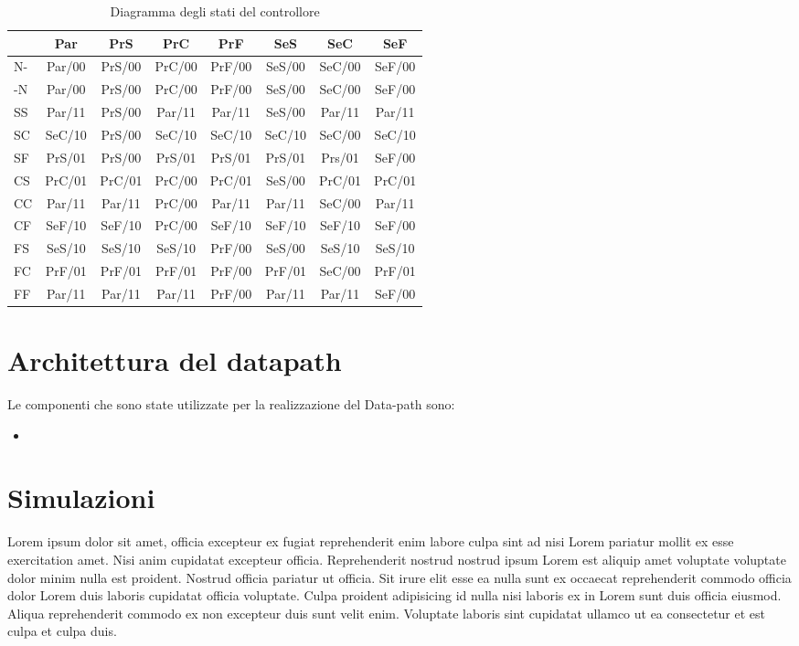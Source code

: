 \documentclass[a4paper]{article}
\begin{document}
\begin{table}[H]
	\begin{center}
		\begin{tabular}{l|c|c|c|c|c|c|c}
			   & Par    & PrS    & PrC    & PrF    & SeS    & SeC    & SeF    \\
			\hline
			N- & Par/00 & PrS/00 & PrC/00 & PrF/00 & SeS/00 & SeC/00 & SeF/00 \\
			\hline
			-N & Par/00 & PrS/00 & PrC/00 & PrF/00 & SeS/00 & SeC/00 & SeF/00 \\
			\hline
			SS & Par/11 & PrS/00 & Par/11 & Par/11 & SeS/00 & Par/11 & Par/11 \\
			\hline
			SC & SeC/10 & PrS/00 & SeC/10 & SeC/10 & SeC/10 & SeC/00 & SeC/10 \\
			\hline
			SF & PrS/01 & PrS/00 & PrS/01 & PrS/01 & PrS/01 & Prs/01 & SeF/00 \\
			\hline
			CS & PrC/01 & PrC/01 & PrC/00 & PrC/01 & SeS/00 & PrC/01 & PrC/01 \\
			\hline
			CC & Par/11 & Par/11 & PrC/00 & Par/11 & Par/11 & SeC/00 & Par/11 \\
			\hline
			CF & SeF/10 & SeF/10 & PrC/00 & SeF/10 & SeF/10 & SeF/10 & SeF/00 \\
			\hline
			FS & SeS/10 & SeS/10 & SeS/10 & PrF/00 & SeS/00 & SeS/10 & SeS/10 \\
			\hline
			FC & PrF/01 & PrF/01 & PrF/01 & PrF/00 & PrF/01 & SeC/00 & PrF/01 \\
			\hline
			FF & Par/11 & Par/11 & Par/11 & PrF/00 & Par/11 & Par/11 & SeF/00 \\
			\hline
		\end{tabular}
	\end{center}
	\caption{Diagramma degli stati del controllore}
\end{table}


\section{Architettura del datapath}
Le componenti che sono state utilizzate per la realizzazione del Data-path sono:
\begin{itemize}
	\item
\end{itemize}


\section{Simulazioni}
Lorem ipsum dolor sit amet, officia excepteur ex fugiat reprehenderit enim labore culpa sint ad nisi Lorem pariatur mollit ex esse exercitation amet. Nisi anim cupidatat excepteur officia. Reprehenderit nostrud nostrud ipsum Lorem est aliquip amet voluptate voluptate dolor minim nulla est proident. Nostrud officia pariatur ut officia. Sit irure elit esse ea nulla sunt ex occaecat reprehenderit commodo officia dolor Lorem duis laboris cupidatat officia voluptate. Culpa proident adipisicing id nulla nisi laboris ex in Lorem sunt duis officia eiusmod. Aliqua reprehenderit commodo ex non excepteur duis sunt velit enim. Voluptate laboris sint cupidatat ullamco ut ea consectetur et est culpa et culpa duis.
\end{document}
